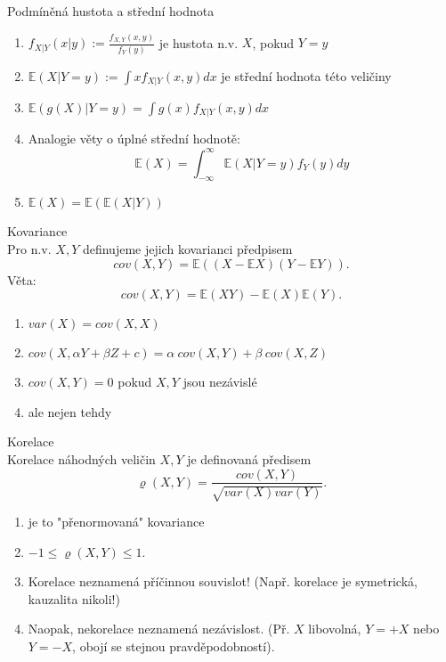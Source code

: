 \documentclass[../main.tex]{subfiles}
\begin{document}
\begin{definition}
    Podmíněná hustota a střední hodnota
    \begin{enumerate}
        \item $f_{X|Y}(x|y) := \frac{f_{X,Y}(x,y)}{f_Y(y)}$ je hustota n.v. $X$, pokud $Y = y$
        \item $\mathbb{E}(X|Y=y):=\int xf_{X|Y}(x,y)dx$ je střední hodnota této veličiny
        \item $\mathbb{E}(g(X)|Y=y) = \int g(x)f_{X|Y}(x,y)dx$
        \item Analogie věty o úplné střední hodnotě:
        \[\mathbb{E}(X) = \int^\infty_{-\infty}\mathbb{E}(X|Y=y)f_Y(y)dy\]
        \item $\mathbb{E}(X) = \mathbb{E}(\mathbb{E}(X|Y))$
    \end{enumerate}
\end{definition}
\begin{definition}
    Kovariance\\

    Pro n.v. $X,Y$ definujeme jejich kovarianci předpisem
    \[cov(X,Y) = \mathbb{E}((X-\mathbb{E}X)(Y-\mathbb{E}Y)).\]
    Věta:
    \[cov(X,Y) = \mathbb{E}(XY) - \mathbb{E}(X)\mathbb{E}(Y).\]
    \begin{enumerate}
        \item $var(X) = cov(X,X)$
        \item $cov(X,\alpha Y + \beta Z + c) = \alpha\ cov(X,Y) + \beta\ cov(X,Z)$
        \item $cov(X,Y) = 0$ pokud $X,Y$ jsou nezávislé
        \item ale nejen tehdy
    \end{enumerate}
\end{definition}
\begin{definition}
    Korelace\\

    Korelace náhodných veličin $X,Y$ je definovaná předisem
    \[\varrho (X,Y) = \frac{cov(X,Y)}{\sqrt{var(X)var(Y)}}.\]
    \begin{enumerate}
        \item je to "přenormovaná" kovariance
        \item $-1 \leq \varrho(X,Y) \leq 1$.
        \item Korelace neznamená příčinnou souvislot! (Např. korelace je symetrická, kauzalita nikoli!)
        \item Naopak, nekorelace neznamená nezávislost. (Př. $X$ libovolná, $Y = +X$ nebo $Y = -X$, obojí se stejnou pravděpodobností).    \end{enumerate}
\end{definition}
\end{document}

